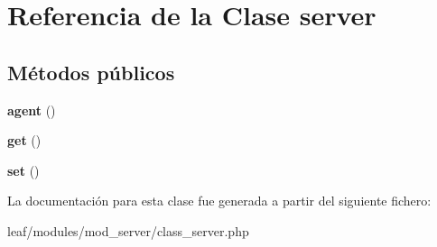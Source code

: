 \hypertarget{classserver}{\section{Referencia de la Clase server}
\label{classserver}
}
\subsection*{Métodos públicos}
\begin{DoxyCompactItemize}
\item 
\hypertarget{classserver_a77f6a261d70e66c7b7273774832482dc}{{\bfseries agent} ()}\label{classserver_a77f6a261d70e66c7b7273774832482dc}

\item 
\hypertarget{classserver_ac33ee765f5ad9f134540bac393721cfe}{{\bfseries get} ()}\label{classserver_ac33ee765f5ad9f134540bac393721cfe}

\item 
\hypertarget{classserver_a89f017a6c12e98acec0d6833ea9c8994}{{\bfseries set} ()}\label{classserver_a89f017a6c12e98acec0d6833ea9c8994}

\end{DoxyCompactItemize}


La documentación para esta clase fue generada a partir del siguiente fichero\-:\begin{DoxyCompactItemize}
\item 
leaf/modules/mod\-\_\-server/class\-\_\-server.\-php\end{DoxyCompactItemize}
